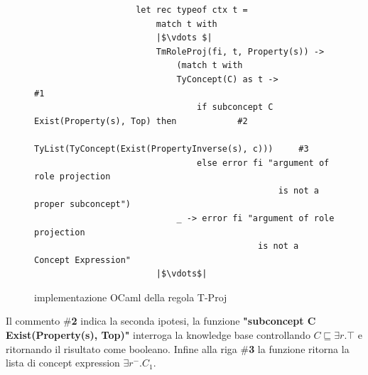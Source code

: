             \begin{figure}[h] 
                \begin{verbatim}
                    let rec typeof ctx t =
                        match t with
                        |$\vdots $|
                        TmRoleProj(fi, t, Property(s)) ->
                            (match t with                                
                            TyConcept(C) as t ->                                        #1
                                if subconcept C Exist(Property(s), Top) then            #2
                                    TyList(TyConcept(Exist(PropertyInverse(s), c)))     #3
                                else error fi "argument of role projection 
                                                is not a proper subconcept")
                            _ -> error fi "argument of role projection 
                                            is not a Concept Expression"
                        |$\vdots$|
                \end{verbatim}
            \caption{implementazione OCaml della regola T-Proj}
            \end{figure}
            Il commento \textbf{$\boldsymbol{\#}$2} indica la seconda ipotesi, la funzione \textbf{"subconcept C Exist(Property(s), Top)"} interroga la knowledge base controllando $C \sqsubseteq \exists r . \top$ e ritornando il risultato come
            booleano.
            Infine alla riga \textbf{$\boldsymbol{\#}$3} la funzione ritorna la lista di concept expression  $\exists r^- . C_1$.


        
        